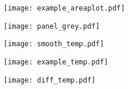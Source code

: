 \documentclass[xcolor=dvipsnames, 12pt]{beamer}
\begin{document}
\begin{frame}

\begin{figure}[h!]
\hspace*{-1cm}
 \centering
 \texttt{[image: example\_areaplot.pdf]}

\end{figure}

\end{frame}

\begin{frame}

\begin{figure}[h!]
\hspace*{-1cm}
 \centering
 \texttt{[image: panel\_grey.pdf]}

\end{figure}

\end{frame}

\begin{frame}

\begin{figure}[h!]
\hspace*{-1cm}
 \centering
 \texttt{[image: smooth\_temp.pdf]}

\end{figure}

\end{frame}

\begin{frame}

\begin{figure}[h!]
\hspace*{-1cm}
 \centering
 \texttt{[image: example\_temp.pdf]}

\end{figure}

\end{frame}

\begin{frame} 

\begin{figure}[h!]
\hspace*{-1cm}
 \centering
 \texttt{[image: diff\_temp.pdf]}

\end{figure}

\end{frame}



\end{document}
